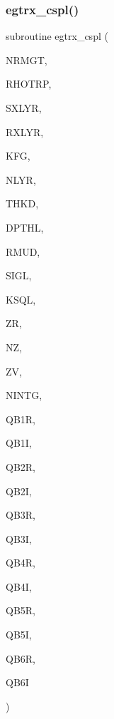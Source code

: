 \subsubsection{\texorpdfstring{egtrx\+\_\+cspl()}{egtrx\_cspl()}}
{\footnotesize\ttfamily subroutine egtrx\+\_\+cspl (\begin{DoxyParamCaption}\item[{integer}]{N\+R\+M\+GT,  }\item[{real, dimension(nrmgt)}]{R\+H\+O\+T\+RP,  }\item[{integer}]{S\+X\+L\+YR,  }\item[{integer}]{R\+X\+L\+YR,  }\item[{integer}]{K\+FG,  }\item[{integer}]{N\+L\+YR,  }\item[{real (kind=ql), dimension(nlyr)}]{T\+H\+KD,  }\item[{real (kind=ql), dimension(nlyr)}]{D\+P\+T\+HL,  }\item[{real (kind=ql), dimension(0\+:nlyr)}]{R\+M\+UD,  }\item[{complex(kind=ql), dimension(nlyr)}]{S\+I\+GL,  }\item[{complex(kind=ql), dimension(nlyr)}]{K\+S\+QL,  }\item[{real (kind=ql)}]{ZR,  }\item[{integer}]{NZ,  }\item[{real, dimension(nz)}]{ZV,  }\item[{integer}]{N\+I\+N\+TG,  }\item[{real, dimension (4,nrmgt,nz)}]{Q\+B1R,  }\item[{real, dimension (4,nrmgt,nz)}]{Q\+B1I,  }\item[{real, dimension (4,nrmgt,nz)}]{Q\+B2R,  }\item[{real, dimension (4,nrmgt,nz)}]{Q\+B2I,  }\item[{real, dimension (4,nrmgt,nz)}]{Q\+B3R,  }\item[{real, dimension (4,nrmgt,nz)}]{Q\+B3I,  }\item[{real, dimension (4,nrmgt,nz)}]{Q\+B4R,  }\item[{real, dimension (4,nrmgt,nz)}]{Q\+B4I,  }\item[{real, dimension (4,nrmgt,nz)}]{Q\+B5R,  }\item[{real, dimension (4,nrmgt,nz)}]{Q\+B5I,  }\item[{real, dimension (4,nrmgt,nz)}]{Q\+B6R,  }\item[{real, dimension (4,nrmgt,nz)}]{Q\+B6I }\end{DoxyParamCaption})}

